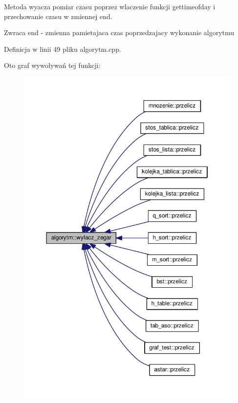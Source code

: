 Metoda wyacza pomiar czasu poprzez wlaczenie funkcji {\ttfamily gettimeofday} i przechowanie czasu w zmiennej {\ttfamily end}. 

\begin{DoxyReturn}{Zwraca}
end -\/ zmienna pamietajaca czas poprzedzajacy wykonanie algorytmu 
\end{DoxyReturn}


Definicja w linii 49 pliku algorytm.\-cpp.



Oto graf wywoływań tej funkcji\-:\nopagebreak
\begin{figure}[H]
\begin{center}
\leavevmode
\includegraphics[width=350pt]{classalgorytm_a12c132e1a407f5dd38796f4d24308a6c_icgraph}
\end{center}
\end{figure}


